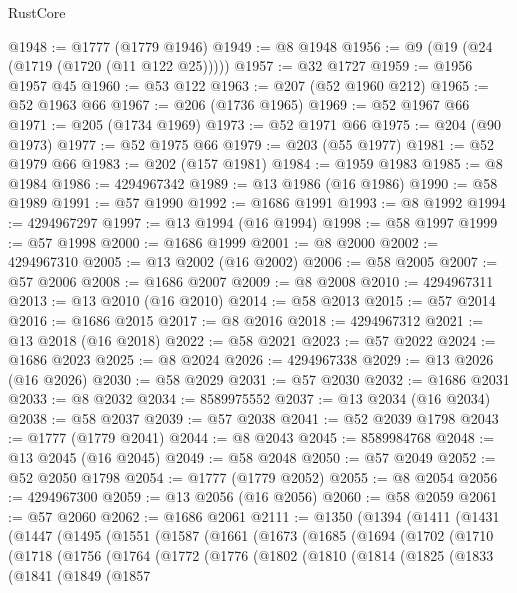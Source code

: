 \begin{lexlean}{RustCore}
\begin{coremodule}
@1948 := @1777 (@1779 @1946)
@1949 := @8 @1948
@1956 := @9 (@19 (@24 (@1719 (@1720 (@11 @122 @25)))))
@1957 := @32 @1727
@1959 := @1956 @1957 @45
@1960 := @53 @122
@1963 := @207 (@52 @1960 @212)
@1965 := @52 @1963 @66
@1967 := @206 (@1736 @1965)
@1969 := @52 @1967 @66
@1971 := @205 (@1734 @1969)
@1973 := @52 @1971 @66
@1975 := @204 (@90 @1973)
@1977 := @52 @1975 @66
@1979 := @203 (@55 @1977)
@1981 := @52 @1979 @66
@1983 := @202 (@157 @1981)
@1984 := @1959 @1983
@1985 := @8 @1984
@1986 := 4294967342
@1989 := @13 @1986 (@16 @1986)
@1990 := @58 @1989
@1991 := @57 @1990
@1992 := @1686 @1991
@1993 := @8 @1992
@1994 := 4294967297
@1997 := @13 @1994 (@16 @1994)
@1998 := @58 @1997
@1999 := @57 @1998
@2000 := @1686 @1999
@2001 := @8 @2000
@2002 := 4294967310
@2005 := @13 @2002 (@16 @2002)
@2006 := @58 @2005
@2007 := @57 @2006
@2008 := @1686 @2007
@2009 := @8 @2008
@2010 := 4294967311
@2013 := @13 @2010 (@16 @2010)
@2014 := @58 @2013
@2015 := @57 @2014
@2016 := @1686 @2015
@2017 := @8 @2016
@2018 := 4294967312
@2021 := @13 @2018 (@16 @2018)
@2022 := @58 @2021
@2023 := @57 @2022
@2024 := @1686 @2023
@2025 := @8 @2024
@2026 := 4294967338
@2029 := @13 @2026 (@16 @2026)
@2030 := @58 @2029
@2031 := @57 @2030
@2032 := @1686 @2031
@2033 := @8 @2032
@2034 := 8589975552
@2037 := @13 @2034 (@16 @2034)
@2038 := @58 @2037
@2039 := @57 @2038
@2041 := @52 @2039 @1798
@2043 := @1777 (@1779 @2041)
@2044 := @8 @2043
@2045 := 8589984768
@2048 := @13 @2045 (@16 @2045)
@2049 := @58 @2048
@2050 := @57 @2049
@2052 := @52 @2050 @1798
@2054 := @1777 (@1779 @2052)
@2055 := @8 @2054
@2056 := 4294967300
@2059 := @13 @2056 (@16 @2056)
@2060 := @58 @2059
@2061 := @57 @2060
@2062 := @1686 @2061
@2111 := @1350
    (@1394
      (@1411
        (@1431
          (@1447
            (@1495
              (@1551
                (@1587
                  (@1661
                    (@1673
                      (@1685
                        (@1694
                          (@1702
                            (@1710
                              (@1718
                                (@1756
                                  (@1764
                                    (@1772
                                      (@1776
                                        (@1802
                                          (@1810
                                            (@1814
                                              (@1825
                                                (@1833
                                                  (@1841
                                                    (@1849
                                                      (@1857

\end{coremodule}
\end{lexlean}
